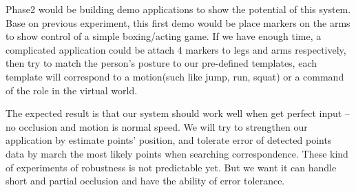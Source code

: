 \documentclass[10pt,twocolumn,letterpaper]{article}
\begin{document}
Phase2 would be building demo applications to show the potential of this system.
Base on previous experiment, this first demo would be place markers on the arms 
to show control of a simple boxing/acting game. If we have enough time, a complicated
application could be attach 4 markers to legs and arms respectively, then try to match 
the person's posture to our pre-defined templates, each template will correspond to 
a motion(such like jump, run, squat) or a command of the role in the virtual world.

The expected result is that our system should work well when get perfect input 
-- no occlusion and motion is normal speed. We will try to strengthen 
our application by estimate points' position, and tolerate error of detected 
points data by march the most likely points when searching correspondence. 
These kind of experiments of robustness is not predictable yet. 
But we want it can handle short and partial occlusion and have the ability of error tolerance. 

{\small


}

\end{document}
